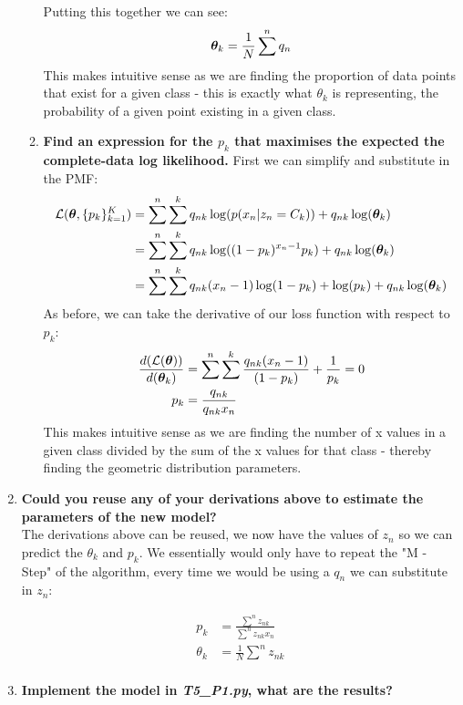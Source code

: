 \documentclass[submit]{harvardml}
\begin{document}
\begin{enumerate}
\begin{enumerate}
        Putting this together we can see:
        \begin{align*}
            \boldsymbol{\theta}_k = \frac{1}{N} \sum^n q_n\\
        \end{align*}
        This makes intuitive sense as we are finding the proportion of data points that exist for a given class - this is exactly what $\theta_k$ is representing, the probability of a given point existing in a given class.
        \item \textbf{Find an expression for the $p_k$ that maximises the expected the complete-data log likelihood.}
        First we can simplify and substitute in the PMF:
        \begin{align*}
            \mathcal{L}(\boldsymbol{\theta}, \{p_k\}^K_{k=1}) &= \sum^n \sum^k q_{nk}  \log  ( p(x_n| z_n = C_k)) + q_{nk}  \log( \boldsymbol{\theta}_k)\\
            &= \sum^n \sum^k q_{nk}  \log  ( (1 - p_k)^{x_n - 1} p_k ) + q_{nk}  \log( \boldsymbol{\theta}_k)\\
            &= \sum^n \sum^k q_{nk}  (x_n - 1)\log (1 - p_k) +\log(p_k) + q_{nk}  \log( \boldsymbol{\theta}_k)\\
        \end{align*}
        As before, we can take the derivative of our loss function with respect to $p_k$:
        \begin{align*}
            \frac{d(\mathcal{L}(\boldsymbol{\theta}))}{d(\boldsymbol{\theta}_k)} &= \sum^n \sum^k \frac{q_{nk}(x_n - 1)}{(1 - p_k)} +\frac{1}{p_k} = 0\\
            p_k &= \frac{q_{nk}}{q_{nk} x_n}
        \end{align*}
        This makes intuitive sense as we are finding the number of x values in a given class divided by the sum of the x values for that class - thereby finding the geometric distribution parameters.
    \end{enumerate}
    \item \textbf{Could you reuse any of your derivations above to estimate the parameters of the new model?}\\
    The derivations above can be reused, we now have the values of $z_n$ so we can predict the $\theta_k$ and $p_k$. 
    We essentially would only have to repeat the "M - Step" of the algorithm, every time we would be using a $q_n$ we can substitute in $z_n$:
    
    \begin{align*}
        p_k &= \frac{\sum^n z_{nk}}{\sum^n z_{nk} x_n}\\
        \theta_k &= \frac{1}{N} \sum^n z_{nk}\\
    \end{align*}
   \item \textbf{Implement the model in \textit{T5\_P1.py}, what are the results?}\\
   

\end{enumerate}
\end{document}
